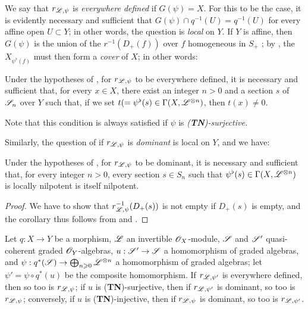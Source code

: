 We say that $r_{\mathscr{L},\psi}$ is \emph{everywhere defined} if $G(\psi)=X$.
For this to be the case, it is evidently necessary and sufficient that $G(\psi)\cap q^{-1}(U)=q^{-1}(U)$ for every affine open $U\subset Y$;
in other words, the question is \emph{local} on $Y$.
If $Y$ is affine, then $G(\psi)$ is the union of the $r^{-1}(D_+(f))$ over $f$ homogeneous in $S_+$ ;
by , the $X_{\psi^\flat(f)}$ must then form a \emph{cover} of $X$;
in other words:

\begin{corollary}[3.7.4]
\label{II.3.7.4}
Under the hypotheses of , for $r_{\mathscr{L},\psi}$ to be everywhere defined, it is necessary and sufficient that, for every $x\in X$, there exist an integer $n>0$ and a section $s$ of $\mathscr{S}_n$ over $Y$ such that, if we set $t(=\psi^\flat(s)\in\Gamma(X,\mathscr{L}^{\otimes n})$, then $t(x)\neq0$.
\end{corollary}

Note that this condition is always satisfied if $\psi$ is \emph{(\textbf{TN})-surjective.}

Similarly, the question of if $r_{\mathscr{L},\psi}$ is \emph{dominant} is local on $Y$, and we have:

\begin{corollary}[3.7.5]
\label{II.3.7.5}
Under the hypotheses of , for $r_{\mathscr{L},\psi}$ to be dominant, it is necessary and sufficient that, for every integer $n>0$, every section $s\in S_n$ such that $\psi^\flat(s)\in\Gamma(X,\mathscr{L}^{\otimes n})$ is locally nilpotent is itself nilpotent.
\end{corollary}

\begin{proof}
We have to show that $r_{\mathscr{L},\psi}^{-1}(D_+(s))$ is not empty if $D_+(s)$ is empty, and the corollary thus follows from  and .
\end{proof}

\begin{proposition}[3.7.6]
\label{II.3.7.6}
Let $q:X\to Y$ be a morphism, $\mathscr{L}$ an invertible $\mathscr{O}_X$-module, $\mathscr{S}$ and $\mathscr{S}'$ quasi-coherent graded $\mathscr{O}_Y$-algebras, $u:\sh{S}'\to\sh{S}$ a homomorphism of graded algebras, and $\psi:q^*(\sh{S})\to\bigoplus_{n\geq0}\sh{L}^{\otimes n}$ a homomorphism  of graded algebras;
let $\psi'=\psi\circ q^*(u)$ be the composite homomorphism.
If $r_{\mathscr{L},\psi'}$ is everywhere defined, then so too is $r_{\mathscr{L},\psi}$;
if $u$ is (\textbf{TN})-surjective, then if $r_{\mathscr{L},\psi'}$ is dominant, so too is $r_{\mathscr{L},\psi}$;
conversely, if $u$ is (\textbf{TN})-injective, then if $r_{\mathscr{L},\psi}$ is dominant, so too is $r_{\mathscr{L},\psi'}$.
\end{proposition}

